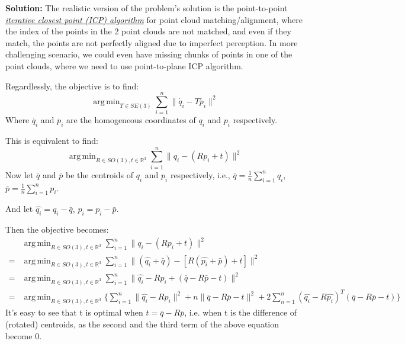 \documentclass[conference,onecolumn]{IEEEtran}
\DeclareMathOperator*{\argmin}{arg\,min}
\begin{document}
\begin{enumerate}[label=\arabic{enumi}.]
          \textbf{Solution:}
          The realistic version of the problem's solution is the point-to-point \href{https://en.wikipedia.org/wiki/Iterative_closest_point}{\textit{iterative closest point (ICP) algorithm}} for point cloud matching/alignment, where the index of the points in the 2 point clouds are not matched, and even if they match, the points are not perfectly aligned due to imperfect perception.
          In more challenging scenario, we could even have missing chunks of points in one of the point clouds, where we need to use point-to-plane ICP algorithm.

          Regardlessly, the objective is to find:
          $$
              \argmin_{T \in SE(3)} \sum_{i = 1}^n \|\dot{q_i} - T\dot{p_i}\|^2
          $$
          Where $\dot{q_i}$ and $\dot{p_i}$ are the homogeneous coordinates of $q_i$ and $p_i$ respectively.

          This is equivalent to find:
          $$
              \argmin_{R \in SO(3), t \in \mathbb{R}^3} \sum_{i = 1}^n \|q_i - (Rp_i + t)\|^2
          $$
          Now let $\bar{q}$ and $\bar{p}$ be the centroids of $q_i$ and $p_i$ respectively, i.e., $\bar{q} = \frac{1}{n}\sum\limits_{i=1}^n q_i$, $\bar{p} = \frac{1}{n}\sum\limits_{i=1}^n p_i$.

          And let $\hat{q_i} = q_i - \bar{q}$, $\hat{p_i} = p_i - \bar{p}$.

          Then the objective becomes:
          \begin{align*}
                & \argmin_{R \in SO(3), t \in \mathbb{R}^3} \sum_{i = 1}^n \|q_i - (Rp_i + t)\|^2                                                                                                                            \\
              = & \argmin_{R \in SO(3), t \in \mathbb{R}^3} \sum_{i = 1}^n \|(\hat{q_i} + \bar{q}) - [R(\hat{p_i} + \bar{p}) + t]\|^2                                                                                        \\
              = & \argmin_{R \in SO(3), t \in \mathbb{R}^3} \sum_{i = 1}^n \|\hat{q_i} - R\hat{p_i} + (\bar{q} - R\bar{p} - t)\|^2                                                                                           \\
              = & \argmin_{R \in SO(3), t \in \mathbb{R}^3} \{ \sum_{i = 1}^n \|\hat{q_i} - R\hat{p_i}\|^2 + n\|\bar{q} - R\bar{p} - t\|^2 + 2 \sum\limits_{n = 1}^n (\hat{q_i} - R \hat{p_i})^T (\bar{q} - R\bar{p} - t) \}
          \end{align*}
          It's easy to see that t is optimal when $t = \bar{q} - R\bar{p}$, i.e. when t is the difference of (rotated) centroids, as the second and the third term of the above equation become 0.


\end{enumerate}
\end{document}
